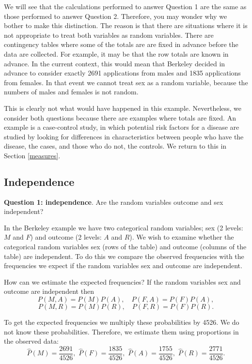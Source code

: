 \documentclass[
  british,
  11pt,
  openany, a4paper]{book}
\begin{document}
We will see that the calculations performed to answer Question 1 are the same as those performed to answer Question 2. Therefore, you may wonder why we bother to make this distinction. The reason is that there are situations where it is not appropriate to treat both variables as random variables. There are contingency tables where some of the totals are are fixed in advance before the data are collected. For example, it may be that the row totals are known in advance. In the current context, this would mean that Berkeley decided in advance to consider exactly 2691 applications from males and 1835 applications from females. In that event we cannot treat sex as a random variable, because the numbers of males and females is not random.

This is clearly not what would have happened in this example. Nevertheless, we consider both questions because there are examples where totals are fixed. An example is a case-control study, in which potential risk factors for a disease are studied by looking for differences in characteristics between people who have the disease, the cases, and those who do not, the controls. We return to this in Section \ref{measures}.

\subsection{Independence}\label{indep}

\textbf{Question 1: independence}. Are the random variables outcome and sex independent?

In the Berkeley example we have two categorical random variables; sex (2 levels: \(M\) and \(F\)) and outcome (2 levels: \(A\) and \(R\)). We wish to examine whether the categorical random variables sex (rows of the table) and outcome (columns of the table) are independent. To do this we compare the observed frequencies with the frequencies we expect if the random variables sex and outcome are independent.

How can we estimate the expected frequencies? If the random variables sex and outcome are independent then
\[ P(M, A) = P(M)P(A), \quad P(F, A)=P(F)P(A), \]
\[ P(M, R) = P(M)P(R), \quad P(F, R)=P(F)P(R).  \]

To get the expected frequencies we multiply these probabilities by 4526. We do not know these probabilities. Therefore, we estimate them using proportions in the observed data:
\[ \hat{P}(M)=\frac{2691}{4526}, \,\, \hat{P}(F)=\frac{1835}{4526}, \,\,
\hat{P}(A)=\frac{1755}{4526}, \,\, \hat{P}(R)=\frac{2771}{4526}.  \]
\end{document}
